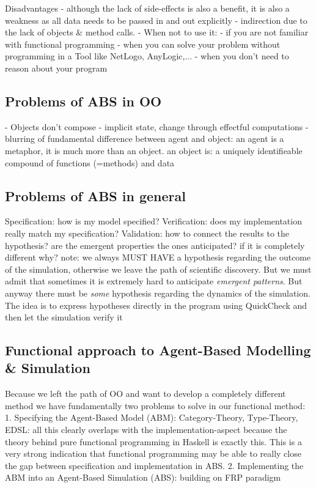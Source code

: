 Disadvantages
- although the lack of side-effects is also a benefit, it is also a weakness as all data needs to be passed in and out explicitly 
- indirection due to the lack of objects \& method calls.
- When not to use it: 
	- if you are not familiar with functional programming
	- when you can solve your problem without programming in a Tool like NetLogo, AnyLogic,...
	- when you don't need to reason about your program
	
\subsection{Problems of ABS in OO}
- Objects don't compose
- implicit state, change through effectful computations
- blurring of fundamental difference between agent and object: an agent is a metaphor, it is much more than an object. an object is: a uniquely identifieable compound of functions (=methods) and data

\subsection{Problems of ABS in general}
Specification: how is my model specified? 
Verification: does my implementation really match my specification? 
Validation: how to connect the results to the hypothesis? are the emergent properties the ones anticipated? if it is completely different why? note: we always MUST HAVE a hypothesis regarding the outcome of the simulation, otherwise we leave the path of scientific discovery. But we must admit that sometimes it is extremely hard to anticipate \textit{emergent patterns}. But anyway there must be \textit{some} hypothesis regarding the dynamics of the simulation.
The idea is to express hypotheses directly in the program using QuickCheck and then let the simulation verify it

\subsection{Functional approach to Agent-Based Modelling \& Simulation}
Because we left the path of OO and want to develop a completely different method we have fundamentally two problems to solve in our functional method:
1. Specifying the Agent-Based Model (ABM): Category-Theory, Type-Theory, EDSL: all this clearly overlaps with the  implementation-aspect because the theory behind pure functional programming in Haskell is exactly this. This is a very strong indication that functional programming may be able to really close the gap between specification and implementation in ABS.
2. Implementing the ABM into an Agent-Based Simulation (ABS): building on FRP paradigm

